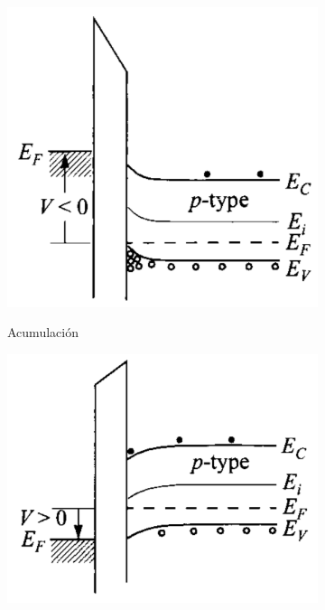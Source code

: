\begin{figure}[H]
    \centering
    \begin{subfigure}[b]{.3\textwidth}
        \includegraphics{figuras/mos/acumulacion.png}
        \label{fig:mosacumulacion}
        \caption{Acumulación}
    \end{subfigure}
    \begin{subfigure}[b]{.3\textwidth}
        \includegraphics{figuras/mos/desercion.png}

\end{subfigure}
\end{figure}
